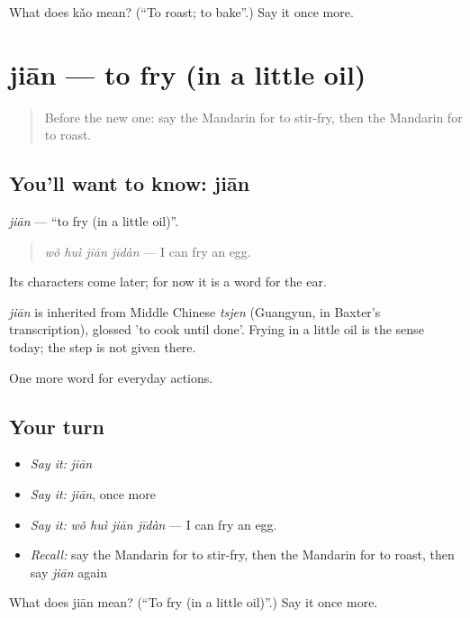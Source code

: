 \begin{tcolorbox}[breakable,colback=teal!4,colframe=teal!35!black,title={Before you move on}]
What does kǎo mean? (\textquotedblleft{}To roast; to bake\textquotedblright{}.) Say it once more.
\end{tcolorbox}
\section[jiān]{jiān — to fry (in a little oil)}

\label{lesson:ZH-C113-jian}



\begin{quote}
Before the new one: say the Mandarin for to stir-fry, then the Mandarin for to roast.
\end{quote}

\subsection*{You'll want to know: jiān}
\emph{jiān} — \textquotedblleft{}to fry (in a little oil)\textquotedblright{}.

\begin{quote}
\emph{wǒ huì jiān jīdàn} — I can fry an egg.
\end{quote}

Its characters come later; for now it is a word for the ear.

\begin{cousinweb}
\emph{jiān} is inherited from Middle Chinese \emph{tsjen} (Guangyun, in Baxter's transcription), glossed 'to cook until done'. Frying in a little oil is the sense today; the step is not given there.
\end{cousinweb}

\begin{grammarlens}[title={What you've built}]
One more word for everyday actions.
\end{grammarlens}

\subsection*{Your turn}
\begin{itemize}
\raggedright
  \item \emph{Say it:} \emph{jiān}
  \item \emph{Say it:} \emph{jiān}, once more
  \item \emph{Say it:} \emph{wǒ huì jiān jīdàn} — I can fry an egg.
  \item \emph{Recall:} say the Mandarin for to stir-fry, then the Mandarin for to roast, then say \emph{jiān} again
\end{itemize}

\begin{tcolorbox}[breakable,colback=teal!4,colframe=teal!35!black,title={Before you move on}]
What does jiān mean? (\textquotedblleft{}To fry (in a little oil)\textquotedblright{}.) Say it once more.
\end{tcolorbox}
